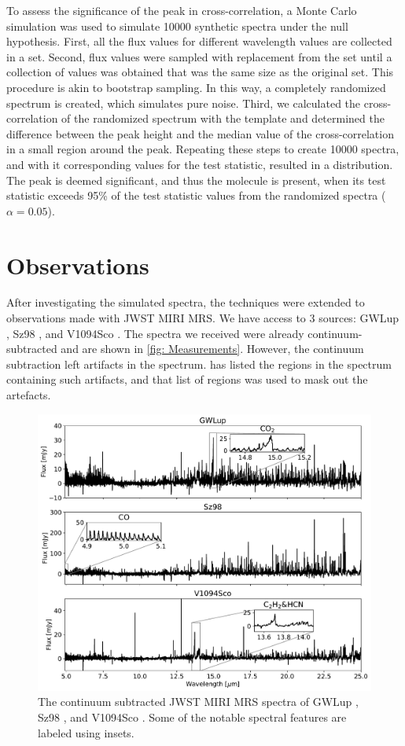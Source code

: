 \documentclass[twoside, single, authoryear, semicolon, 12pt]{lion-msc}
\newcommand{\4}{$_4$}
\newcommand{\3}{$_3$}
\newcommand{\2}{$_2$}
\begin{document}
To assess the significance of the peak in cross-correlation, a Monte Carlo simulation was used to simulate 10000 synthetic spectra under the null hypothesis. First, all the flux values for different wavelength values are collected in a set. Second, flux values were sampled with replacement from the set until a collection of values was obtained that was the same size as the original set. This procedure is akin to bootstrap sampling. In this way, a completely randomized spectrum is created, which simulates pure noise. Third, we calculated the cross-correlation of the randomized spectrum with the template and determined the difference between the peak height and the median value of the cross-correlation in a small region around the peak. Repeating these steps to create 10000 spectra, and with it corresponding values for the test statistic, resulted in a distribution. The peak is deemed significant, and thus the molecule is present, when its test statistic exceeds 95\% of the test statistic values from the randomized spectra ($\alpha=0.05$).


\section{Observations}
After investigating the simulated spectra, the techniques were extended to observations made with JWST MIRI MRS. We have access to 3 sources: GWLup \citep{Gasman_2023}, Sz98 \citep{Grant_2023}, and V1094Sco \citep{taboneinprepp}. The spectra we received were already continuum-subtracted and are shown in \autoref{fig: Measurements}. However, the continuum subtraction left artifacts in the spectrum. \cite{Grant_2023} has listed the regions in the spectrum containing such artifacts, and that list of regions was used to mask out the artefacts. 

\begin{figure}[H]
    \centering
    \includegraphics[width=\linewidth]{Figures/Measurements.pdf}
    \caption{The continuum subtracted JWST MIRI MRS spectra of GWLup \citep{Gasman_2023}, Sz98 \citep{Grant_2023}, and V1094Sco \citep{taboneinprepp}. Some of the notable spectral features are labeled using insets.}
    \label{fig: Measurements}
\end{figure}
\end{document}
